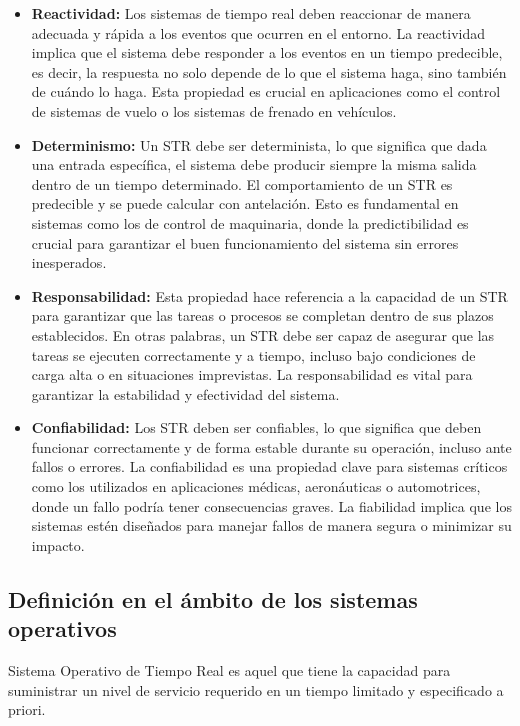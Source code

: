 \documentclass[a4paper,12pt]{article}
\begin{document}
\begin{itemize}
    \item \textbf{Reactividad:} Los sistemas de tiempo real deben reaccionar de manera adecuada y rápida a los eventos que ocurren en el entorno. La reactividad implica que el sistema debe responder a los eventos en un tiempo predecible, es decir, la respuesta no solo depende de lo que el sistema haga, sino también de cuándo lo haga. Esta propiedad es crucial en aplicaciones como el control de sistemas de vuelo o los sistemas de frenado en vehículos.
    
    \item \textbf{Determinismo:} Un STR debe ser determinista, lo que significa que dada una entrada específica, el sistema debe producir siempre la misma salida dentro de un tiempo determinado. El comportamiento de un STR es predecible y se puede calcular con antelación. Esto es fundamental en sistemas como los de control de maquinaria, donde la predictibilidad es crucial para garantizar el buen funcionamiento del sistema sin errores inesperados.
    
    \item \textbf{Responsabilidad:} Esta propiedad hace referencia a la capacidad de un STR para garantizar que las tareas o procesos se completan dentro de sus plazos establecidos. En otras palabras, un STR debe ser capaz de asegurar que las tareas se ejecuten correctamente y a tiempo, incluso bajo condiciones de carga alta o en situaciones imprevistas. La responsabilidad es vital para garantizar la estabilidad y efectividad del sistema.
    
    \item \textbf{Confiabilidad:} Los STR deben ser confiables, lo que significa que deben funcionar correctamente y de forma estable durante su operación, incluso ante fallos o errores. La confiabilidad es una propiedad clave para sistemas críticos como los utilizados en aplicaciones médicas, aeronáuticas o automotrices, donde un fallo podría tener consecuencias graves. La fiabilidad implica que los sistemas estén diseñados para manejar fallos de manera segura o minimizar su impacto.
\end{itemize}

\subsection{Definición en el ámbito de los sistemas operativos}

Sistema Operativo de Tiempo Real es aquel que tiene la capacidad para suministrar un nivel de servicio requerido en un tiempo limitado y especificado a priori.
\end{document}
